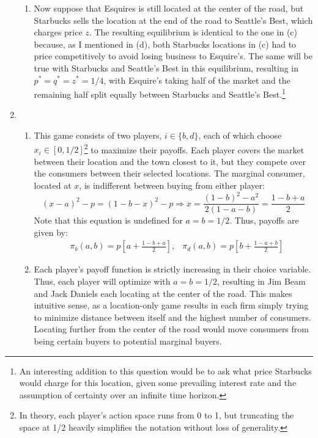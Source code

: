 \documentclass{article}
\begin{document}
\begin{enumerate}
\begin{enumerate}
    \item Now suppose that Esquires is still located at the center of the road, but Starbucks sells the location at the end of the road to Seattle's Best, which charges price $z$. The resulting equilibrium is identical to the one in (c) because, as I mentioned in (d), both Starbucks locations in (c) had to price competitively to avoid losing business to Esquire's. The same will be true with Starbucks and Seattle's Best in this equilibrium, resulting in ${p^*=q^*=z^*=1/4}$, with Esquire's taking half of the market and the remaining half split equally between Starbucks and Seattle's Best.\footnote{An interesting addition to this question would be to ask what price Starbucks would charge for this location, given some prevailing interest rate and the assumption of certainty over an infinite time horizon.}
      
  \end{enumerate}

  \item  
  \begin{enumerate}
    \item This game consists of two players, $i\in\{b,d\}$, each of which choose $x_i\in\left[0,1/2\right]$\footnote{In theory, each player's action space runs from 0 to 1, but truncating the space at 1/2 heavily simplifies the notation without loss of generality.} to maximize their payoffs. Each player covers the market between their location and the town closest to it, but they compete over the consumers between their selected locations. The marginal consumer, located at $x$, is indifferent between buying from either player: \[
      (x-a)^2 - p = (1-b-x)^2 - p \Rightarrow x = \frac{(1-b)^2-a^2}{2(1-a-b)} = \frac{1-b+a}{2}
    \]
    Note that this equation is undefined for ${a=b=1/2}$. Thus, payoffs are given by:
      \begin{align*}
        &\pi_b(a,b) = p\left[a + \frac{1-b+a}{2}\right],
        &\pi_d(a,b) = p\left[b + \frac{1-a+b}{2}\right]
      \end{align*}

    \item Each player's payoff function is strictly increasing in their choice variable. Thus, each player will optimize with ${a=b=1/2}$, resulting in Jim Beam and Jack Daniels each locating at the center of the road. This makes intuitive sense, as a location-only game results in each firm simply trying to minimize distance between itself and the highest number of consumers. Locating further from the center of the road would move consumers from being certain buyers to potential marginal buyers.


\end{enumerate}
\end{enumerate}
\end{document}
